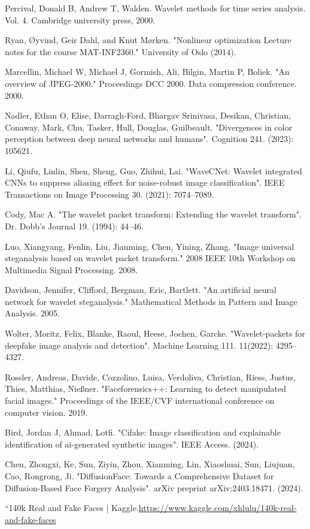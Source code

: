 \documentclass{svproc}
\begin{document}
\begin{thebibliography}{6}
Percival, Donald B, Andrew T, Walden. Wavelet methods for time series analysis. Vol. 4. Cambridge university press, 2000.

Ryan, Øyvind, Geir Dahl, and Knut Mørken. "Nonlinear optimization Lecture notes for the course MAT-INF2360." University of Oslo (2014).

Marcellin, Michael W, Michael J, Gormish, Ali, Bilgin, Martin P, Boliek. "An overview of JPEG-2000." Proceedings DCC 2000. Data compression conference. 2000.

Nadler, Ethan O, Elise, Darragh-Ford, Bhargav Srinivasa, Desikan, Christian, Conaway, Mark, Chu, Tasker, Hull, Douglas, Guilbeault. "Divergences in color perception between deep neural networks and humans". Cognition 241. (2023): 105621.

Li, Qiufu, Linlin, Shen, Sheng, Guo, Zhihui, Lai. "WaveCNet: Wavelet integrated CNNs to suppress aliasing effect for noise-robust image classification". IEEE Transactions on Image Processing 30. (2021): 7074–7089.

Cody, Mac A. "The wavelet packet transform: Extending the wavelet transform". Dr. Dobb's Journal 19. (1994): 44–46.

Luo, Xiangyang, Fenlin, Liu, Jianming, Chen, Yining, Zhang. "Image universal steganalysis based on wavelet packet transform." 2008 IEEE 10th Workshop on Multimedia Signal Processing. 2008.

Davidson, Jennifer, Clifford, Bergman, Eric, Bartlett. "An artificial neural network for wavelet steganalysis." Mathematical Methods in Pattern and Image Analysis. 2005.

Wolter, Moritz, Felix, Blanke, Raoul, Heese, Jochen, Garcke. "Wavelet-packets for deepfake image analysis and detection". Machine Learning 111. 11(2022): 4295–4327.

Rossler, Andreas, Davide, Cozzolino, Luisa, Verdoliva, Christian, Riess, Justus, Thies, Matthias, Nießner. "Faceforensics++: Learning to detect manipulated facial images." Proceedings of the IEEE/CVF international conference on computer vision. 2019.

Bird, Jordan J, Ahmad, Lotfi. "Cifake: Image classification and explainable identification of ai-generated synthetic images". IEEE Access. (2024).

Chen, Zhongxi, Ke, Sun, Ziyin, Zhou, Xianming, Lin, Xiaoshuai, Sun, Liujuan, Cao, Rongrong, Ji. "DiffusionFace: Towards a Comprehensive Dataset for Diffusion-Based Face Forgery Analysis". arXiv preprint arXiv:2403.18471. (2024).

“140k Real and Fake Faces | Kaggle.\url{https://www.kaggle.com/xhlulu/140k-real-and-fake-faces}


\end{thebibliography}
\end{document}
